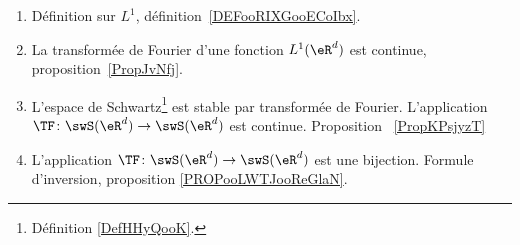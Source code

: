 \begin{enumerate}
	\item
	      Définition sur \( L^1\), définition~\ref{DEFooRIXGooECoIbx}.
	\item
	      La transformée de Fourier d'une fonction \( L^1(\eR^d)\) est continue, proposition~\ref{PropJvNfj}.
	\item
	      L'espace de Schwartz\footnote{Définition \ref{DefHHyQooK}.} est stable par transformée de Fourier. L'application \( \TF\colon \swS(\eR^d)\to \swS(\eR^d)\) est continue. Proposition ~\ref{PropKPsjyzT}
	\item
	      L'application \( \TF\colon \swS(\eR^d)\to \swS(\eR^d)\) est une bijection. Formule d'inversion, proposition \ref{PROPooLWTJooReGlaN}.
\end{enumerate}
